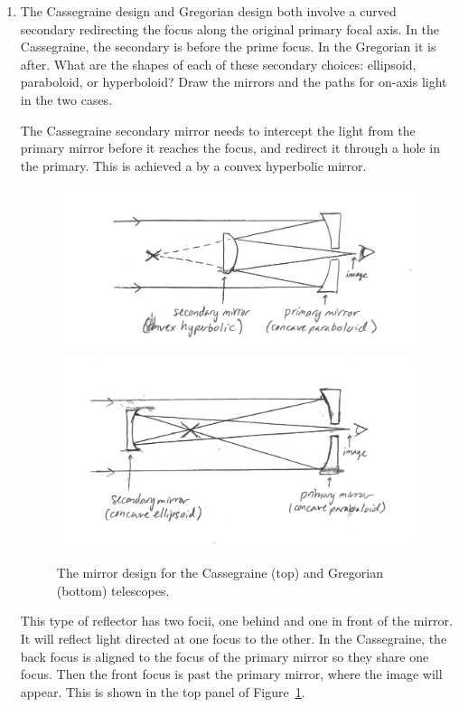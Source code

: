 \begin{enumerate}
\item The Cassegraine design and Gregorian design both involve a
curved secondary redirecting the focus along the original primary
focal axis. In the Cassegraine, the secondary is before the prime
focus. In the Gregorian it is after. What are the shapes of each of
these secondary choices: ellipsoid, paraboloid, or hyperboloid? Draw
the mirrors and the paths for on-axis light in the two cases.

\begin{answer}
The Cassegraine secondary mirror needs to intercept the light from the
primary mirror before it reaches the focus, and redirect it through a
hole in the primary. This is achieved a by a convex hyperbolic mirror.

\begin{figure}[!h]	
\includegraphics[width=1\columnwidth]{figures/cassegraine.jpg}
\includegraphics[width=1\columnwidth]{figures/gregorian.jpg}
\caption{The mirror design for the Cassegraine (top) and Gregorian
(bottom) telescopes.}
\label{fig:cassgreg}
\end{figure}

This type of reflector has two focii, one behind and one in front of
the mirror. It will reflect light directed at one focus to the
other. In the Cassegraine, the back focus is aligned to the focus of
the primary mirror so they share one focus. Then the front focus is
past the primary mirror, where the image will appear. This is shown in
the top panel of Figure~\ref{fig:cassgreg}.


\end{answer}
\end{enumerate}
